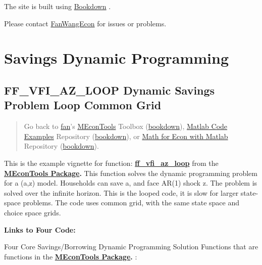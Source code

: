 \documentclass[
]{book}
\begin{document}
The site is built using \href{https://bookdown.org/}{Bookdown} \citep{R-bookdown}.

Please contact \href{https://fanwangecon.github.io/}{FanWangEcon} for issues or problems.

\hypertarget{savings-dynamic-programming}{%
\chapter{Savings Dynamic Programming}\label{savings-dynamic-programming}}

\hypertarget{ff_vfi_az_loop-dynamic-savings-problem-loop-common-grid}{%
\section{FF\_VFI\_AZ\_LOOP Dynamic Savings Problem Loop Common Grid}\label{ff_vfi_az_loop-dynamic-savings-problem-loop-common-grid}}

\begin{quote}
Go back to \href{http://fanwangecon.github.io/}{fan}'s \href{https://fanwangecon.github.io/MEconTools/}{MEconTools} Toolbox (\href{https://fanwangecon.github.io/MEconTools/bookdown}{bookdown}), \href{https://fanwangecon.github.io/M4Econ/}{Matlab Code Examples} Repository (\href{https://fanwangecon.github.io/M4Econ/bookdown}{bookdown}), or \href{https://fanwangecon.github.io/Math4Econ/}{Math for Econ with Matlab} Repository (\href{https://fanwangecon.github.io/Math4Econ/bookdown}{bookdown}).
\end{quote}

This is the example vignette for function:
\href{https://github.com/FanWangEcon/MEconTools/blob/master/MEconTools/vfi/ff_vfi_az_loop.m}{\textbf{ff\_vfi\_az\_loop}}
from the \href{https://fanwangecon.github.io/MEconTools/}{\textbf{MEconTools
Package}}\textbf{.} This function
solves the dynamic programming problem for a (a,z) model. Households can
save a, and face AR(1) shock z. The problem is solved over the infinite
horizon. This is the looped code, it is slow for larger state-space
problems. The code uses common grid, with the same state space and
choice space grids.

\textbf{Links to Four Code:}

Four Core Savings/Borrowing Dynamic Programming Solution Functions that
are functions in the \href{https://fanwangecon.github.io/MEconTools/}{\textbf{MEconTools
Package}}\textbf{.} :
\end{document}
